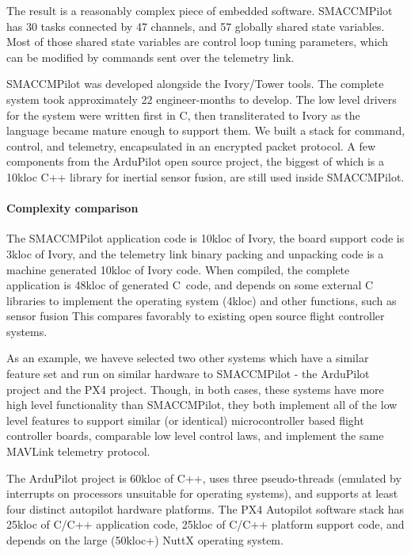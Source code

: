 The result is a reasonably complex piece of embedded software. SMACCMPilot has
30 tasks connected by 47 channels, and 57 globally shared state variables. Most
of those shared state variables are control loop tuning parameters, which can be
modified by commands sent over the telemetry link.

SMACCMPilot was developed alongside the Ivory/Tower tools.  The complete system
took approximately 22 engineer-months to develop.  The low level drivers for the
system were written first in C, then transliterated to Ivory as the language
became mature enough to support them. We built a stack for command, control, and
telemetry, encapsulated in an encrypted packet protocol. A few components from
the ArduPilot open source project, the biggest of which is a 10kloc C++ library
for inertial sensor fusion, are still used inside SMACCMPilot.

\paragraph{Complexity comparison}
The SMACCMPilot application code is 10kloc of Ivory, the board support code
is 3kloc of Ivory, and the telemetry link binary packing and unpacking
code is a machine generated 10kloc of Ivory code. When compiled, the complete
application
is 48kloc of generated C~code, and depends on some external C libraries to
implement the operating system (4kloc) and other functions, such as sensor
fusion  This compares favorably to existing open
source flight controller systems.

As an example, we haveve selected two other systems which have a similar feature
set and run on similar hardware to SMACCMPilot - the ArduPilot
project\cite{apm-proj} and the PX4 project. Though, in
both cases, these systems have more high level functionality than SMACCMPilot,
they both implement all of the low level features to support similar (or
identical) microcontroller based flight controller boards, comparable low level
control laws, and implement the same MAVLink telemetry protocol.

The ArduPilot project is 60kloc of C++, uses three pseudo-threads (emulated by
interrupts on processors unsuitable for operating systems), and supports at
least four distinct autopilot hardware platforms. The PX4 Autopilot software
stack has 25kloc of C/C++ application code, 25kloc of C/C++ platform support
code, and depends on the large (50kloc+) NuttX operating system.

